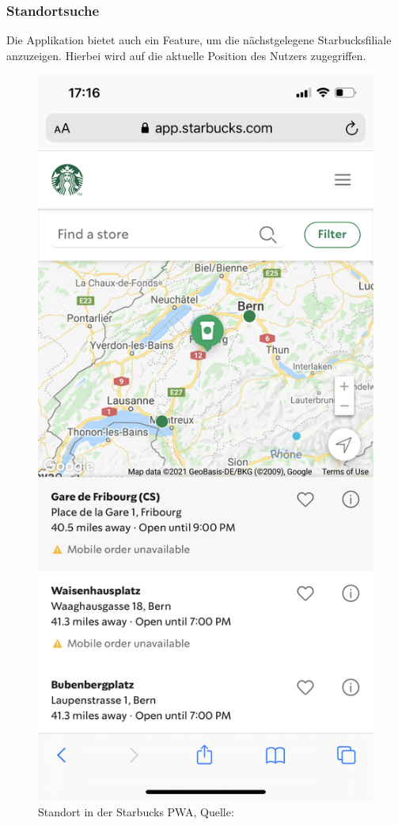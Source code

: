\subsubsection{Standortsuche}
Die Applikation bietet auch ein Feature, um die nächstgelegene Starbucksfiliale anzuzeigen. Hierbei wird auf die aktuelle Position des Nutzers zugegriffen. 
 \begin{figure}[H]
	\centering
	\includegraphics[scale=0.15]{images/starbucks_standort.jpeg}
	\caption[Standort in der Starbucks \gls{PWA}]{Standort in der Starbucks \gls{PWA}, Quelle: \cite{starbucksPwaStandort}}
	\label{img: Standort in der Starbucks PWA}
\end{figure}

